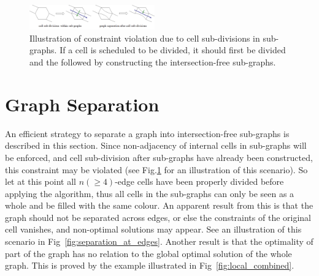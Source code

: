 \documentclass[conference]{IEEEtran}
\begin{document}
\begin{figure}[t]
\centering
\includegraphics[width=0.48\textwidth]{figures/constraint_violation}
\caption{Illustration of constraint violation due to cell sub-divisions in sub-graphs. If a cell is scheduled to be divided, it should first be divided and the followed by  constructing the intersection-free sub-graphs.}
\label{fig:constraint_violation}
\end{figure}

\section{Graph Separation}
\label{section_graph_separation}
 An efficient strategy to separate a graph into intersection-free sub-graphs is described in this section. 
Since non-adjacency of internal cells in sub-graphs will be enforced, and cell sub-division after sub-graphs have already been constructed, 
this constraint may be violated (see Fig.\ref{fig:constraint_violation} for an illustration of this scenario).
So let at this point all $n(\geq 4)$-edge cells have been properly divided before applying the algorithm, 
thus all cells in the sub-graphs can only be seen as a whole and be filled with the same colour. 
An apparent result from this is that the graph should not be separated across edges, or else the constraints of the original cell vanishes, and non-optimal solutions may appear. See an illustration of this scenario in Fig~\ref{fig:separation_at_edges}. 
Another result is that the optimality of part of the graph has no relation to the global optimal solution of the whole graph. 
This is proved by the example illustrated in Fig~\ref{fig:local_combined}. 
\end{document}
